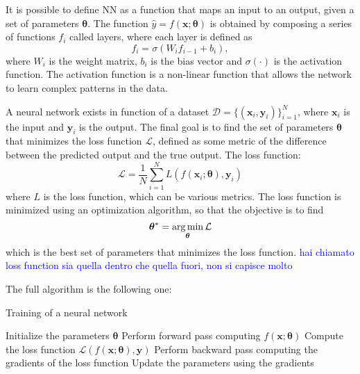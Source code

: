 It is possible to define NN as a function that maps an input to an output, given a set of parameters \( \bm{\theta} \). The function \( \hat{y} = f(\bm{x}; \bm{\theta}) \) is obtained by composing a series of functions \( f_i \) called layers, where each layer is defined as
\begin{equation}
    f_i = \sigma(W_i f_{i-1} + b_i),
\end{equation}
where \( W_i \) is the weight matrix, \( b_i \) is the bias vector and \( \sigma(\cdot) \) is the activation function. The activation function is a non-linear function that allows the network to learn complex patterns in the data. 

A neural network exists in function of a dataset \( \mathcal{D} = \{(\bm{x}_i, \bm{y}_i)\}_{i=1}^N \), where \( \bm{x}_i \) is the input and \( \bm{y}_i \) is the output. The final goal is to find the set of parameters \( \bm{\theta} \) that minimizes the loss function \( \mathcal{L} \), defined as some metric of the difference between the predicted output and the true output. The loss function:
\begin{equation}
    \mathcal{L} = \frac{1}{N} \sum_{i=1}^N L(f(\bm{x}_i; \bm{\theta}), \bm{y}_i)
\end{equation}
where \( L \) is the loss function, which can be various metrics. The loss function is minimized using an optimization algorithm, so that the objective is to find
\begin{equation}
    \bm{\theta}^* = \operatorname*{arg\,min}_{\bm{\theta}} \mathcal{L}
\end{equation}
which is the best set of parameters that minimizes the loss function. \textcolor{blue}{hai chiamato loss function sia quella dentro che quella fuori, non si capisce molto}

The full algorithm is the following one:
\begin{algorithm} 
    \caption{Training of a neural network}
    \begin{algorithmic}
        \State Initialize the parameters \( \bm{\theta} \)
                \State Perform forward pass computing \( f(\bm{x}; \bm{\theta}) \)
                \State Compute the loss function \( \mathcal{L}(f(\bm{x}; \bm{\theta}), \bm{y}) \)
                \State Perform backward pass computing the gradients of the loss function
                \State Update the parameters using the gradients
            \EndFor
        \EndWhile
    \end{algorithmic}
\end{algorithm}

